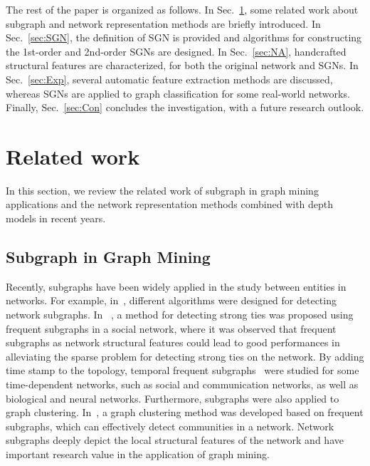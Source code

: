 \documentclass[10pt,journal,compsoc]{IEEEtran}
\begin{document}
The rest of the paper is organized as follows. In Sec.~\ref{sec:related}, some related work about subgraph and network representation methods are briefly introduced. In Sec.~\ref{sec:SGN}, the definition of SGN is provided and algorithms for constructing the 1st-order and 2nd-order SGNs are designed. In Sec.~\ref{sec:NA}, handcrafted structural features are characterized, for both the original network and SGNs. In Sec.~\ref{sec:Exp}, several automatic feature extraction methods are discussed, whereas SGNs are applied to graph classification for some real-world networks. Finally, Sec.~\ref{sec:Con} concludes the investigation, with a future research outlook.


\section{Related work}\label{sec:related}

In this section, we review the related work of subgraph in graph mining applications and the network representation methods combined with depth models in recent years.

\subsection{Subgraph in Graph Mining}
Recently, subgraphs have been widely applied in the study between entities in networks. For example, in~\cite{thoma2010discriminative, wernicke2006efficient, wernicke2005faster}, different algorithms were designed for detecting network subgraphs. In ~\cite{rotabi2017detecting}, a method for detecting strong ties was proposed using frequent subgraphs in a social network, where it was observed that frequent subgraphs as network structural features could lead to good performances in alleviating the sparse problem for detecting strong ties on the network. By adding time stamp to the topology, temporal frequent subgraphs~\cite{kovanen2011temporal, xuan2015temporal, paranjape2017motifs} were studied for some time-dependent networks, such as social and communication networks, as well as biological and neural networks. Furthermore, subgraphs were also applied to graph clustering. In~\cite{tsourakakis2017scalable}, a graph clustering method was developed based on frequent subgraphs, which can effectively detect communities in a network. Network subgraphs deeply depict the local structural features of the network and have important research value in the application of graph mining.
\end{document}
